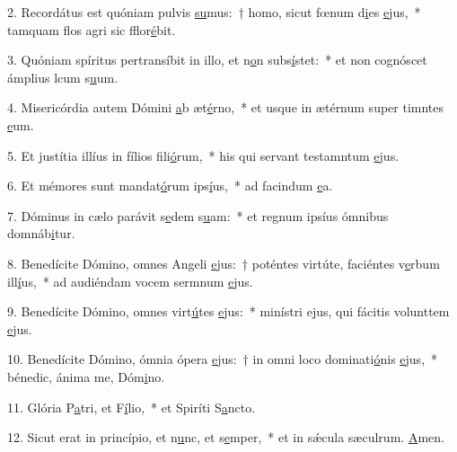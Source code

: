 2. Recordátus est quóniam pulvis \uline{su}mus:~† homo, sicut fœnum d\uline{i}es \uline{e}jus,~* tamquam flos agri sic fflor\uline{é}bit.\par 
3. Quóniam spíritus pertransíbit in illo, et n\uline{o}n subs\uline{í}stet:~* et non cognóscet ámplius lcum s\uline{u}um.\par 
4. Misericórdia autem Dómini \uline{a}b æt\uline{é}rno,~* et usque in ætérnum super timntes \uline{e}um.\par 
5. Et justítia illíus in fílios f\uline{i}li\uline{ó}rum,~* his qui servant testamntum \uline{e}jus.\par 
6. Et mémores sunt mandat\uline{ó}rum ips\uline{í}us,~* ad facindum \uline{e}a.\par 
7. Dóminus in cælo parávit s\uline{e}dem s\uline{u}am:~* et regnum ipsíus ómnibus domnáb\uline{i}tur.\par 
8. Benedícite Dómino, omnes Angeli \uline{e}jus:~† poténtes virtúte, faciéntes v\uline{e}rbum ill\uline{í}us,~* ad audiéndam vocem sermnum \uline{e}jus.\par 
9. Benedícite Dómino, omnes virt\uline{ú}tes \uline{e}jus:~* minístri ejus, qui fácitis volunttem \uline{e}jus.\par 
10. Benedícite Dómino, ómnia ópera \uline{e}jus:~† in omni loco dominati\uline{ó}nis \uline{e}jus,~* bénedic, ánima me, Dóm\uline{i}no.\par 
11. Glória P\uline{a}tri, et F\uline{í}lio,~* et Spiríti S\uline{a}ncto.\par 
12. Sicut erat in princípio, et n\uline{u}nc, et s\uline{e}mper,~* et in sǽcula sæculrum. \uline{A}men.\par 
